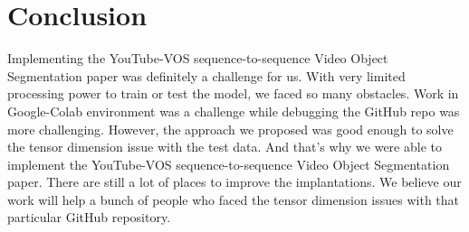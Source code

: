 \documentclass[conference]{IEEEtran}
\begin{document}
\section{Conclusion}
Implementing the YouTube-VOS sequence-to-sequence Video Object Segmentation paper was definitely a challenge for us. With very limited processing power to train or test the model, we faced so many obstacles. Work in Google-Colab environment was a challenge while debugging the GitHub repo was more challenging. However, the approach we proposed was good enough to solve the tensor dimension issue with the test data. And that’s why we were able to implement the YouTube-VOS sequence-to-sequence Video Object Segmentation paper. There are still a lot of places to improve the implantations. We believe our work will help a bunch of people who faced the tensor dimension issues with that particular GitHub repository.





\vspace{12pt}
\end{document}
